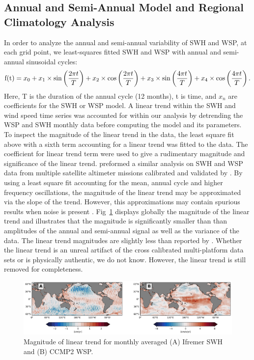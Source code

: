 \documentclass[draft,linenumbers]{agujournal2018}
\begin{document}

\subsection{Annual and Semi-Annual Model and Regional Climatology Analysis}

In order to analyze the annual and semi-annual variability of SWH and WSP, at each grid point, we least-squares fitted SWH and WSP with annual and semi-annual sinusoidal cycles: 
 \begin{equation}
     \mbox{\rm f(t)} = x_0 + x_1\times\sin\left(\frac{2{\pi}t}{T}\right) +  x_2\times\cos\left(\frac{2{\pi}t}{T}\right) + x_3\times\sin\left(\frac{4{\pi}t}{T}\right) + x_4\times\cos\left(\frac{4{\pi}t}{T}\right).
 \end{equation}
Here, T is the duration of the annual cycle (12 months), t is time, and $x_n$ are coefficients for the SWH or WSP model. A linear trend within the SWH and wind speed time series was accounted for within our analysis by detrending the WSP and SWH monthly data before computing the model and its parameters. To inspect the magnitude of the linear trend in the data, the least square fit above with a sixth term accounting for a linear trend was fitted to the data. The coefficient for linear trend term were used to give a rudimentary magnitude and significance of the linear trend. \citet{young2011global} preformed a similar analysis on SWH and WSP data from multiple satellite altimeter missions calibrated and validated by \citet{zieger2009joint}. By using a least square fit accounting for the mean, annual cycle and higher frequency oscillations, the magnitude of the linear trend may be approximated via the slope of the trend. However, this approximations may contain spurious results when noise is present \cite{young2011global}. Fig~\ref{Ifremer_ccmp2_lsf_linear_trend} displays globally the magnitude of the linear trend and illustrates that the magnitude is significantly smaller than than amplitudes of the annual and semi-annual signal as well as the variance of the data. The linear trend magnitudes are slightly less than reported by \citet{young2011global}. Whether the linear trend is an unreal artifact of the cross calibrated multi-platform data sets or is physically authentic, we do not know. However, the linear trend is still removed for completeness. 

\begin{figure}[tbh]
\centering
\includegraphics[width=1.0\textwidth]{figs/lsf_parameters/ccmp2_ifremer_linear_trend_magnitude.png}
\caption{Magnitude of linear trend for monthly averaged (A) Ifremer SWH and (B) CCMP2 WSP.}
\label{Ifremer_ccmp2_lsf_linear_trend}
\end{figure}
\end{document}
